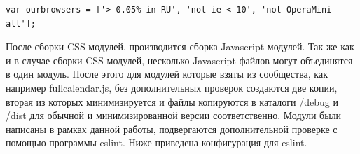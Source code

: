 \begin{small}
\begin{verbatim}
var ourbrowsers = ['> 0.05% in RU', 'not ie < 10', 'not OperaMini all'];
\end{verbatim}
\end{small}


После сборки CSS модулей, производится сборка Javascript модулей. Так же как и в случае сборки CSS модулей, несколько Javascript файлов могут объединятся в один модуль. После этого для модулей которые взяты из сообщества, как например fullcalendar.js, без дополнительных проверок создаются две копии, вторая из которых минимизируется и файлы копируются в каталоги /debug и /dist для обычной и минимизированной версии соответственно. Модули были написаны в рамках данной работы, подвергаются дополнительной проверке с помощью программы eslint. Ниже приведена конфигурация для eslint.  

